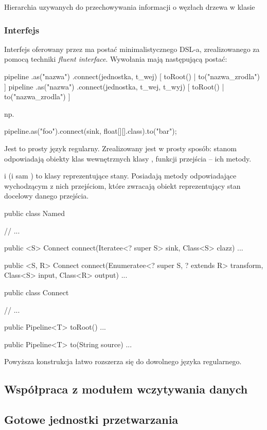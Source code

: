 {Hierarchia uzywanych do przechowywania informacji o węzłach drzewa w klasie }


\subsubsection{Interfejs}

Interfejs oferowany przez  ma postać minimalistycznego DSL-a, zrealizowanego za
pomocą techniki \textit{fluent interface}. Wywołania mają następującą postać:

\begin{java}
  pipeline {  .as("nazwa") } .connect(jednostka, t_wej) [ toRoot() | to("nazwa_zrodla") ]
  pipeline {  .as("nazwa") } .connect(jednostka, t_wej, t_wyj) [ toRoot() | to("nazwa_zrodla") ]
\end{java}

np. 

\begin{java}
  pipeline.as("foo").connect(sink, float[][].class).to("bar");
\end{java}

Jest to prosty język regularny. Zrealizowany jest w prosty sposób: stanom odpowiadają obiekty klas
wewnętrznych klasy , funkcji przejścia -- ich metody.


 i  (i sam ) to klasy reprezentujące stany. Posiadają
metody odpowiadające wychodzącym z nich przejściom, które zwracają obiekt reprezentujący stan
docelowy danego przejścia.

\begin{java}
public class Named {
    // ...

    public <S> Connect connect(Iteratee<? super S> sink, Class<S> clazz) { ... }

    public <S, R> Connect connect(Enumeratee<? super S, ? extends R> transform, 
        Class<S> input, Class<R> output) { ... }
}

public class Connect {
    // ...

    public Pipeline<T> toRoot() { ... }

    public Pipeline<T> to(String source) { ... }

}
\end{java}

\begin{Note}
  Powyższa konstrukcja łatwo rozszerza się do dowolnego języka regularnego. 
\end{Note}


\subsection{Współpraca z modułem wczytywania danych}


\subsection{Gotowe jednostki przetwarzania}



